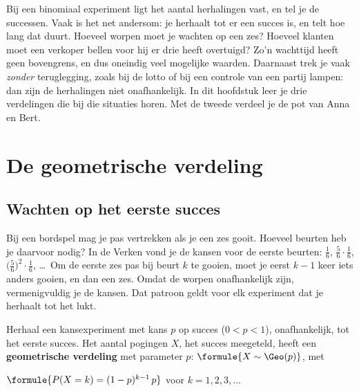 Bij een binomiaal experiment ligt het aantal herhalingen vast, en tel je de successen. Vaak is het net andersom: je herhaalt tot er een succes is, en telt hoe lang dat duurt. Hoeveel worpen moet je wachten op een zes? Hoeveel klanten moet een verkoper bellen voor hij er drie heeft overtuigd? Zo'n wachttijd heeft geen bovengrens, en dus oneindig veel mogelijke waarden. Daarnaast trek je vaak \textit{zonder} teruglegging, zoals bij de lotto of bij een controle van een partij lampen: dan zijn de herhalingen niet onafhankelijk. In dit hoofdstuk leer je drie verdelingen die bij die situaties horen. Met de tweede verdeel je de pot van Anna en Bert.

\begin{oefeningen}[Start]

\end{oefeningen}


\section{De geometrische verdeling}

\subsection{Wachten op het eerste succes}

Bij een bordspel mag je pas vertrekken als je een zes gooit. Hoeveel beurten heb je daarvoor nodig? In de Verken vond je de kansen voor de eerste beurten: $\frac16$, $\frac56 \cdot \frac16$, $\bigl(\frac56\bigr)^2 \cdot \frac16$, \ldots\ Om de eerste zes pas bij beurt $k$ te gooien, moet je eerst $k - 1$ keer iets anders gooien, en dan een zes. Omdat de worpen onafhankelijk zijn, vermenigvuldig je de kansen. Dat patroon geldt voor elk experiment dat je herhaalt tot het lukt.

\begin{theorie}
Herhaal een kansexperiment met kans $p$ op succes ($0 < p < 1$), onafhankelijk, tot het eerste succes. Het aantal pogingen $X$, het succes meegeteld, heeft een \textbf{\textcolor{accent}{geometrische verdeling}} met parameter $p$: $\formule{X \sim \Geo(p)}$, met

\vspace{1mm}
\qquad $\formule{P(X = k) = (1 - p)^{k - 1}\, p}$ \qquad voor $k = 1, 2, 3, \ldots$
\end{theorie}

